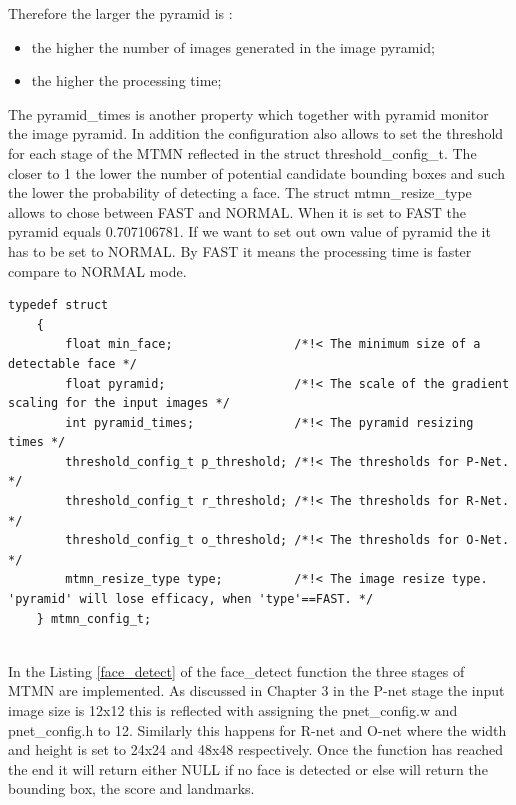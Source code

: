 Therefore the larger the {\selectfont pyramid} is : 
\begin{itemize}
    \item the higher the number of images generated in the image pyramid;
    \item the higher the processing time;
\end{itemize}

The {\selectfont pyramid\_times} is another property which together with {\selectfont pyramid} monitor the image pyramid. In addition the configuration also allows to set the threshold for each stage of the MTMN reflected in the struct {\selectfont threshold\_config\_t}. The closer to 1 the lower the number of potential candidate bounding boxes and such the lower the probability of detecting a face. 
The struct {\selectfont mtmn\_resize\_type} allows to chose between FAST and NORMAL. When it is set to FAST the {\selectfont pyramid} equals 0.707106781. If we want to set out own value of {\selectfont pyramid} the it has to be set to NORMAL. By FAST it means the processing time is faster compare to NORMAL mode. 


\begin{lstlisting}[caption={MTMN configurations },label=mtmn, captionpos=b]
 typedef struct
    {
        float min_face;                 /*!< The minimum size of a detectable face */
        float pyramid;                  /*!< The scale of the gradient scaling for the input images */
        int pyramid_times;              /*!< The pyramid resizing times */
        threshold_config_t p_threshold; /*!< The thresholds for P-Net.  */
        threshold_config_t r_threshold; /*!< The thresholds for R-Net. */
        threshold_config_t o_threshold; /*!< The thresholds for O-Net.  */
        mtmn_resize_type type;          /*!< The image resize type. 'pyramid' will lose efficacy, when 'type'==FAST. */
    } mtmn_config_t;
    
\end{lstlisting}

In the Listing \ref{face_detect}  of the {\selectfont face\_detect} function the three stages of MTMN are implemented. As discussed in Chapter 3 in the P-net stage the input image size is 12x12 this is reflected with assigning the {\selectfont pnet\_config.w} and {\selectfont pnet\_config.h} to 12. Similarly this happens for R-net and O-net where the width and height is set to 24x24 and 48x48 respectively. Once the function has reached the end it will return either NULL if no face is detected or else will return the bounding box, the score and landmarks.


